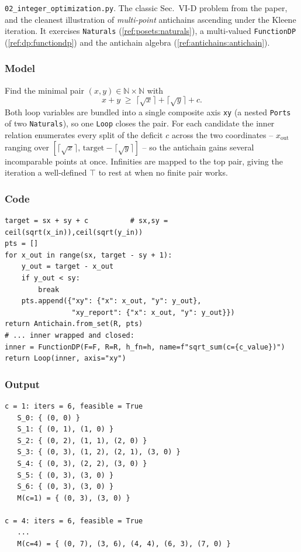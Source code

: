 \documentclass[11pt,a4paper]{article}
\newcommand{\Nat}{\mathbb{N}}
\newcommand{\topp}{\top}
\begin{document}
\texttt{02\_integer\_optimization.py}. The classic Sec.\ VI-D problem from
the paper, and the cleanest illustration of \emph{multi-point} antichains
ascending under the Kleene iteration. It exercises \texttt{Naturals}
(\ref{ref:posets:naturals}), a multi-valued \texttt{FunctionDP}
(\ref{ref:dp:functiondp}) and the antichain algebra
(\ref{ref:antichains:antichain}).

\subsubsection*{Model}

Find the minimal pair $(x,y)\in\Nat\times\Nat$ with
\[
  x + y \;\geq\; \lceil\sqrt{x}\rceil + \lceil\sqrt{y}\rceil + c .
\]
Both loop variables are bundled into a single composite axis \texttt{xy}
(a nested \texttt{Ports} of two \texttt{Naturals}), so one \texttt{Loop}
closes the pair. For each candidate the inner relation enumerates every
split of the deficit $c$ across the two coordinates -- $x_{\text{out}}$
ranging over $[\lceil\sqrt{x}\rceil,\,\text{target}-\lceil\sqrt{y}\rceil]$
-- so the antichain gains several incomparable points at once. Infinities
are mapped to the top pair, giving the iteration a well-defined
$\topp$ to rest at when no finite pair works.

\subsubsection*{Code}

\begin{lstlisting}
target = sx + sy + c          # sx,sy = ceil(sqrt(x_in)),ceil(sqrt(y_in))
pts = []
for x_out in range(sx, target - sy + 1):
    y_out = target - x_out
    if y_out < sy:
        break
    pts.append({"xy": {"x": x_out, "y": y_out},
                "xy_report": {"x": x_out, "y": y_out}})
return Antichain.from_set(R, pts)
# ... inner wrapped and closed:
inner = FunctionDP(F=F, R=R, h_fn=h, name=f"sqrt_sum(c={c_value})")
return Loop(inner, axis="xy")
\end{lstlisting}

\subsubsection*{Output}

\begin{lstlisting}[language={},numbers=none,keywordstyle={}]
c = 1: iters = 6, feasible = True
   S_0: { (0, 0) }
   S_1: { (0, 1), (1, 0) }
   S_2: { (0, 2), (1, 1), (2, 0) }
   S_3: { (0, 3), (1, 2), (2, 1), (3, 0) }
   S_4: { (0, 3), (2, 2), (3, 0) }
   S_5: { (0, 3), (3, 0) }
   S_6: { (0, 3), (3, 0) }
   M(c=1) = { (0, 3), (3, 0) }

c = 4: iters = 6, feasible = True
   ...
   M(c=4) = { (0, 7), (3, 6), (4, 4), (6, 3), (7, 0) }
\end{lstlisting}
\end{document}
